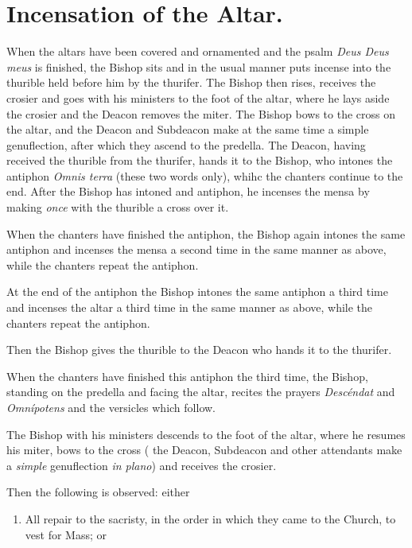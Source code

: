 \documentclass[letterpaper]{report}
\begin{document}
{\section{Incensation of the Altar.}

\rubric When the altars have been covered and ornamented and the psalm
\textit{Deus Deus meus} is finished, the Bishop sits and in the usual manner
puts incense into the thurible held before him by the thurifer. The Bishop then
rises, receives the crosier and goes with his ministers to the foot of the
altar, where he lays aside the crosier and the Deacon removes the miter. The
Bishop bows to the cross on the altar, and the Deacon and Subdeacon make at the
same time a simple genuflection, after which they ascend to the predella. The
Deacon, having received the thurible from the thurifer, hands it to the Bishop,
who intones the antiphon \textit{Omnis terra} (these two words only), whihc the
chanters continue to the end. After the Bishop has intoned and antiphon, he
incenses the mensa by making \textit{once} with the thurible a cross over it.

When the chanters have finished the antiphon, the Bishop again intones the same
antiphon and incenses the mensa a second time in the same manner as above,
while the chanters repeat the antiphon.

At the end of the antiphon the Bishop intones the same antiphon a third time
and incenses the altar a third time in the same manner as above, while the
chanters repeat the antiphon.

Then the Bishop gives the thurible to the Deacon who hands it to the thurifer.

\rubric When the chanters have finished this antiphon the third time, the
Bishop, standing on the predella and facing the altar, recites the prayers
\textit{Descéndat} and \textit{Omnípotens} and the versicles which follow.

\rubric The Bishop with his ministers descends to the foot of the altar, where
he resumes his miter, bows to the cross ( the Deacon, Subdeacon and other
attendants make a \textit{simple} genuflection \textit{in plano}) and receives
the crosier.

Then the following is observed: either

\begin{enumerate}

    \item All repair to the sacristy, in the order in which they came to the
        Church, to vest for Mass; or


\end{enumerate}}
\end{document}
